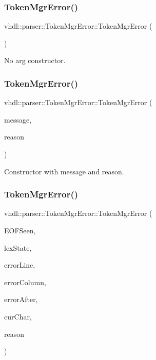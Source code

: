 \subsubsection{\texorpdfstring{TokenMgrError()}{TokenMgrError()}\hspace{0.1cm}{\footnotesize\ttfamily [1/3]}}
{\footnotesize\ttfamily vhdl\+::parser\+::\+Token\+Mgr\+Error\+::\+Token\+Mgr\+Error (\begin{DoxyParamCaption}{ }\end{DoxyParamCaption})}

No arg constructor. \mbox{\label{classvhdl_1_1parser_1_1_token_mgr_error_aa6a0985a512482d5bba1d4a30293570c}} 
\subsubsection{\texorpdfstring{TokenMgrError()}{TokenMgrError()}\hspace{0.1cm}{\footnotesize\ttfamily [2/3]}}
{\footnotesize\ttfamily vhdl\+::parser\+::\+Token\+Mgr\+Error\+::\+Token\+Mgr\+Error (\begin{DoxyParamCaption}\item[{J\+A\+V\+A\+C\+C\+\_\+\+S\+T\+R\+I\+N\+G\+\_\+\+T\+Y\+PE}]{message,  }\item[{int}]{reason }\end{DoxyParamCaption})}

Constructor with message and reason. \mbox{\label{classvhdl_1_1parser_1_1_token_mgr_error_abe87f03db721798e75bde8602dc37d1f}} 
\subsubsection{\texorpdfstring{TokenMgrError()}{TokenMgrError()}\hspace{0.1cm}{\footnotesize\ttfamily [3/3]}}
{\footnotesize\ttfamily vhdl\+::parser\+::\+Token\+Mgr\+Error\+::\+Token\+Mgr\+Error (\begin{DoxyParamCaption}\item[{bool}]{E\+O\+F\+Seen,  }\item[{int}]{lex\+State,  }\item[{int}]{error\+Line,  }\item[{int}]{error\+Column,  }\item[{J\+A\+V\+A\+C\+C\+\_\+\+S\+T\+R\+I\+N\+G\+\_\+\+T\+Y\+PE}]{error\+After,  }\item[{J\+A\+V\+A\+C\+C\+\_\+\+C\+H\+A\+R\+\_\+\+T\+Y\+PE}]{cur\+Char,  }\item[{int}]{reason }\end{DoxyParamCaption})}

